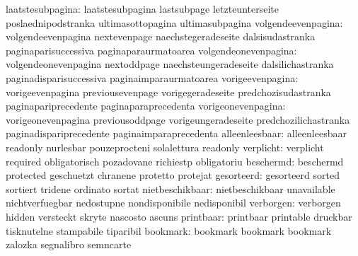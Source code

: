          laatstesubpagina: laatstesubpagina          lastsubpage
                           letzteunterseite          poslaednipodstranka
                           ultimasottopagina         ultimasubpagina
       volgendeevenpagina: volgendeevenpagina        nextevenpage
                           naechstegeradeseite       dalsisudastranka
                           paginaparisuccessiva      paginaparaurmatoarea
     volgendeonevenpagina: volgendeonevenpagina      nextoddpage
                           naechsteungeradeseite     dalsilichastranka
                           paginadisparisuccessiva   paginaimparaurmatoarea
         vorigeevenpagina: vorigeevenpagina          previousevenpage
                           vorigegeradeseite         predchozisudastranka
                           paginapariprecedente      paginaparaprecedenta
       vorigeonevenpagina: vorigeonevenpagina        previousoddpage
                           vorigeungeradeseite       predchozilichastranka
                           paginadispariprecedente   paginaimparaprecedenta
           alleenleesbaar: alleenleesbaar            readonly
                           nurlesbar                 pouzeprocteni
                           solalettura               readonly
                verplicht: verplicht                 required
                           obligatorisch             pozadovane
                           richiestp                 obligatoriu
                beschermd: beschermd                 protected
                           geschuetzt                chranene
                           protetto                  protejat
               gesorteerd: gesorteerd                sorted
                           sortiert                  tridene
                           ordinato                  sortat
          nietbeschikbaar: nietbeschikbaar           unavailable
                           nichtverfuegbar           nedostupne
                           nondisponibile            nedisponibil
                verborgen: verborgen                 hidden
                           versteckt                 skryte
                           nascosto                  ascuns
                printbaar: printbaar                 printable
                           druckbar                  tisknutelne
                           stampabile                tiparibil
                 bookmark: bookmark                  bookmark
                           bookmark                  zalozka
                           segnalibro                semncarte

